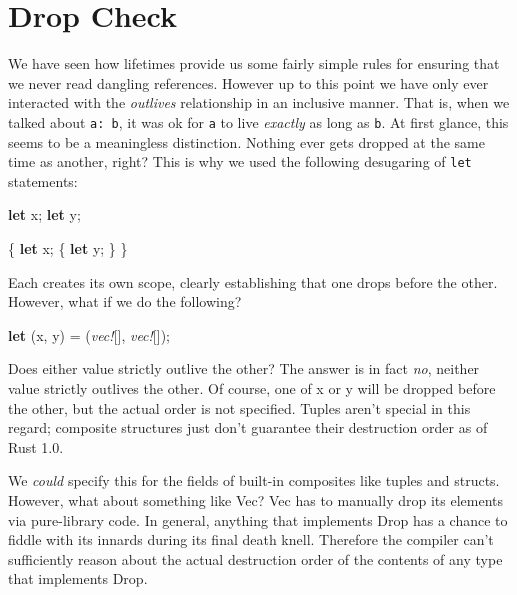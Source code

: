 \documentclass[a4paper,]{book}
\newenvironment{Shaded}{\begin{snugshade}}{\end{snugshade}}
\newcommand{\KeywordTok}[1]{\textcolor[rgb]{0.13,0.29,0.53}{\textbf{{#1}}}}
\newcommand{\PreprocessorTok}[1]{\textcolor[rgb]{0.56,0.35,0.01}{\textit{{#1}}}}
\newcommand{\NormalTok}[1]{{#1}}
\begin{document}
\section{Drop Check}\label{sec--dropck}

We have seen how lifetimes provide us some fairly simple rules for
ensuring that we never read dangling references. However up to this
point we have only ever interacted with the \emph{outlives} relationship
in an inclusive manner. That is, when we talked about
\texttt{\textquotesingle{}a:\ \textquotesingle{}b}, it was ok for
\texttt{\textquotesingle{}a} to live \emph{exactly} as long as
\texttt{\textquotesingle{}b}. At first glance, this seems to be a
meaningless distinction. Nothing ever gets dropped at the same time as
another, right? This is why we used the following desugaring of
\texttt{let} statements:

\begin{Shaded}
\begin{Highlighting}[]
\KeywordTok{let} \NormalTok{x;}
\KeywordTok{let} \NormalTok{y;}
\end{Highlighting}
\end{Shaded}

\begin{Shaded}
\begin{Highlighting}[]
\NormalTok{\{}
    \KeywordTok{let} \NormalTok{x;}
    \NormalTok{\{}
        \KeywordTok{let} \NormalTok{y;}
    \NormalTok{\}}
\NormalTok{\}}
\end{Highlighting}
\end{Shaded}

Each creates its own scope, clearly establishing that one drops before
the other. However, what if we do the following?

\begin{Shaded}
\begin{Highlighting}[]
\KeywordTok{let} \NormalTok{(x, y) = (}\PreprocessorTok{vec!}\NormalTok{[], }\PreprocessorTok{vec!}\NormalTok{[]);}
\end{Highlighting}
\end{Shaded}

Does either value strictly outlive the other? The answer is in fact
\emph{no}, neither value strictly outlives the other. Of course, one of
x or y will be dropped before the other, but the actual order is not
specified. Tuples aren't special in this regard; composite structures
just don't guarantee their destruction order as of Rust 1.0.

We \emph{could} specify this for the fields of built-in composites like
tuples and structs. However, what about something like Vec? Vec has to
manually drop its elements via pure-library code. In general, anything
that implements Drop has a chance to fiddle with its innards during its
final death knell. Therefore the compiler can't sufficiently reason
about the actual destruction order of the contents of any type that
implements Drop.
\end{document}

